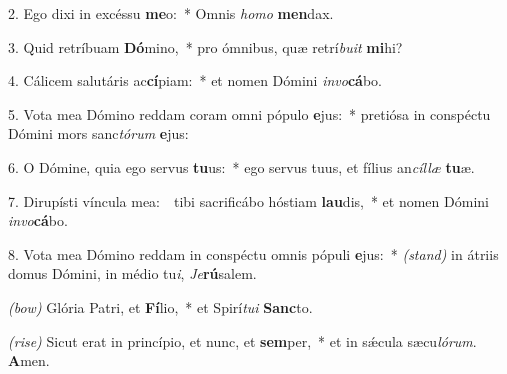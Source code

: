 2. Ego dixi in excéssu \textbf{me}o:~* Omnis \textit{ho}\textit{mo} \textbf{men}dax.

3. Quid retríbuam \textbf{Dó}mino,~* pro ómnibus, quæ retrí\textit{bu}\textit{it} \textbf{mi}hi?

4. Cálicem salutáris ac\textbf{cí}piam:~* et nomen Dómini \textit{in}\textit{vo}\textbf{cá}bo.

5. Vota mea Dómino reddam coram omni pópulo \textbf{e}jus:~* pretiósa in conspéctu Dómini mors sanc\textit{tó}\textit{rum} \textbf{e}jus:

6. O Dómine, quia ego servus \textbf{tu}us:~* ego servus tuus, et fílius an\textit{cíl}\textit{læ} \textbf{tu}æ.

7. Dirupísti víncula mea:~{\color{red}\GreDagger}\ tibi sacrificábo hóstiam \textbf{lau}dis,~* et nomen Dómini \textit{in}\textit{vo}\textbf{cá}bo.

8. Vota mea Dómino reddam in conspéctu omnis pópuli \textbf{e}jus:~* {\color{red}\textit{(stand)}} in átriis domus Dómini, in médio tu\textit{i}, \textit{Je}\textbf{rú}salem.

{\color{red}\textit{(bow)}} Glória Patri, et \textbf{Fí}lio,~* et Spirí\textit{tu}\textit{i} \textbf{Sanc}to.

{\color{red}\textit{(rise)}} Sicut erat in princípio, et nunc, et \textbf{sem}per,~* et in s\'{\ae}cula sæcu\textit{ló}\textit{rum}. \textbf{A}men.